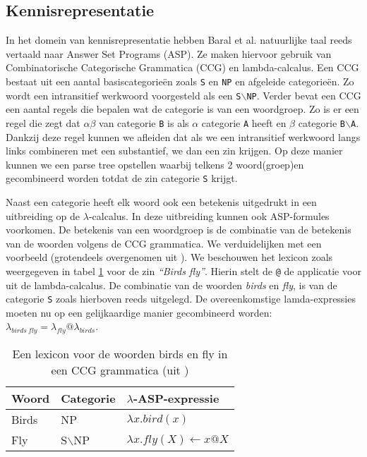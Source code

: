 \documentclass[]{article}
\theoremstyle{definition}
\newcommand{\example}[1]{\textit{``#1''}}
\begin{document}
\subsection{Kennisrepresentatie}
In het domein van kennisrepresentatie hebben Baral et al. \cite{Baral2008} natuurlijke taal reeds vertaald naar Answer Set Programs (ASP). Ze maken hiervoor gebruik van Combinatorische Categorische Grammatica (CCG) en lambda-calcalus. Een CCG bestaat uit een aantal basiscategorieën zoals \texttt{S} en \texttt{NP} en afgeleide categorieën. Zo wordt een intransitief werkwoord voorgesteld als een \texttt{S$\backslash$NP}. Verder bevat een CCG een aantal regels die bepalen wat de categorie is van een woordgroep. Zo is er een regel die zegt dat $\alpha\beta$ van categorie \texttt{B} is als $\alpha$ categorie \texttt{A} heeft en $\beta$ categorie \texttt{B$\backslash$A}. Dankzij deze regel kunnen we afleiden dat als we een intransitief werkwoord langs links combineren met een substantief, we dan een zin krijgen. Op deze manier kunnen we een parse tree opstellen waarbij telkens 2 woord(groep)en gecombineerd worden totdat de zin categorie \texttt{S} krijgt.

Naast een categorie heeft elk woord ook een betekenis uitgedrukt in een uitbreiding op de $\lambda$-calcalus. In deze uitbreiding kunnen ook ASP-formules voorkomen. De betekenis van een woordgroep is de combinatie van de betekenis van de woorden volgens de CCG grammatica. We verduidelijken met een voorbeeld (grotendeels overgenomen uit \cite{Baral2008}). We beschouwen het lexicon zoals weergegeven in tabel \ref{table:CCG} voor de zin \example{Birds fly}. Hierin stelt de \texttt{@} de applicatie voor uit de lambda-calcalus. De combinatie van de woorden \textit{birds} en \textit{fly}, is van de categorie \texttt{S} zoals hierboven reeds uitgelegd. De overeenkomstige lamda-expressies moeten nu op een gelijkaardige manier gecombineerd worden: $\lambda_{birds\ fly}=\lambda_{fly}@\lambda_{birds}$.

\begin{table}
  \centering
  \begin{tabular}{|l|l|l|}
    \hline
    Woord & Categorie & $\lambda$-ASP-expressie \\
    \hline
    \hline
    Birds & NP & $\lambda x.bird(x)$ \\
    Fly & S$\backslash$NP & $\lambda x.fly(X) \leftarrow x@X$ \\
    \hline
  \end{tabular}
  \caption{Een lexicon voor de woorden birds en fly in een CCG grammatica (uit \cite{Baral2008})}
  \label{table:CCG}
\end{table}
\end{document}
